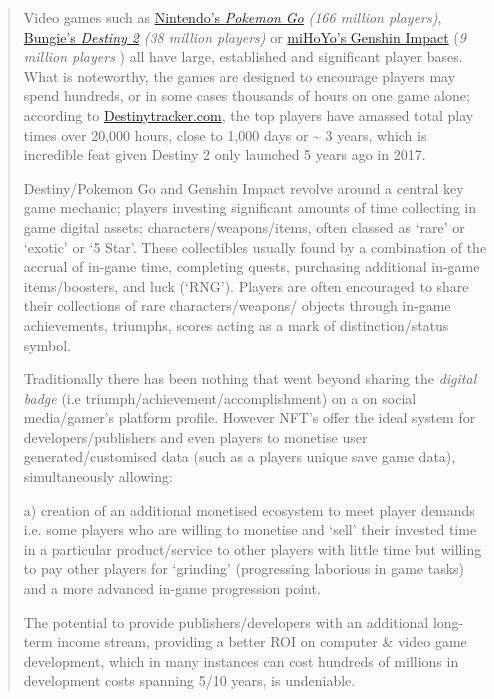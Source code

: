 \begin{quote}
Video games such as
\href{https://www.businessofapps.com/data/pokemon-go-statistics/}{Nintendo's
\emph{Pokemon Go}} \emph{(166 million players)},
\href{https://techacake.com/destiny-2-player-count/\#:~:text=The\%20total\%20player\%20base\%20of,to\%20be\%2038\%20million\%20players.\&text=According\%20to\%20the\%20source\%2C\%20the,in\%20terms\%20of\%20player\%20population.}{Bungie's
\emph{Destiny 2}} \emph{(38 million players)} or
\href{https://fictionhorizon.com/how-many-people-play-genshin-impact/\#:~:text=Genshin\%20Impact\%20had\%20approximately\%209,million\%20users\%20in\%20June\%202021.}{miHoYo's
Genshin Impact} (\emph{9 million players} ) all have large, established
and significant player bases. What is noteworthy, the games are designed
to encourage players may spend hundreds, or in some cases thousands of
hours on one game alone; according to
\href{https://destinytracker.com/destiny/leaderboards/all/minutesplayedtotal?grouped=true\&page=1}{Destinytracker.com},
the top players have amassed total play times over 20,000 hours, close
to 1,000 days or \textasciitilde{} 3 years, which is incredible feat
given Destiny 2 only launched 5 years ago in 2017.

Destiny/Pokemon Go and Genshin Impact revolve around a central key game
mechanic; players investing significant amounts of time collecting in
game digital assets; characters/weapons/items, often classed as `rare'
or `exotic' or `5 Star'. These collectibles usually found by a
combination of the accrual of in-game time, completing quests,
purchasing additional in-game items/boosters, and luck (`RNG'). Players
are often encouraged to share their collections of rare
characters/weapons/ objects through in-game achievements, triumphs,
scores acting as a mark of distinction/status symbol.

Traditionally there has been nothing that went beyond sharing the
\emph{digital badge} (i.e triumph/achievement/accomplishment) on a on
social media/gamer's platform profile. However NFT's offer the ideal
system for developers/publishers and even players to monetise user
generated/customised data (such as a players unique save game data),
simultaneously allowing:

a) creation of an additional monetised ecosystem to meet player demands
i.e. some players who are willing to monetise and `sell' their invested
time in a particular product/service to other players with little time
but willing to pay other players for `grinding' (progressing laborious
in game tasks) and a more advanced in-game progression point.

The potential to provide publishers/developers with an additional
long-term income stream, providing a better ROI on computer \& video
game development, which in many instances can cost hundreds of millions
in development costs spanning 5/10 years, is undeniable.
\end{quote}

